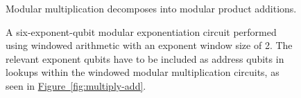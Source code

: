 \documentclass[onecolumn,unpublished]{quantumarticle}
\theoremstyle{definition}
\theoremstyle{definition}
\theoremstyle{definition}
\newcommand{\fig}[1]{\hyperref[fig:#1]{Figure~\ref*{fig:#1}}}
\begin{document}
\begin{figure}[h]
\centering
{}
    \caption{
        \label{fig:multiply}
        Modular multiplication decomposes into modular product additions.
    }
\end{figure}

\begin{figure}[h]
    \caption{
    \label{fig:exponentiation}
    A six-exponent-qubit modular exponentiation circuit performed using windowed arithmetic with an exponent window size of 2.
    The relevant exponent qubits have to be included as address qubits in lookups within the windowed modular multiplication circuits, as seen in \fig{multiply-add}.
    }
\end{figure}
\end{document}
